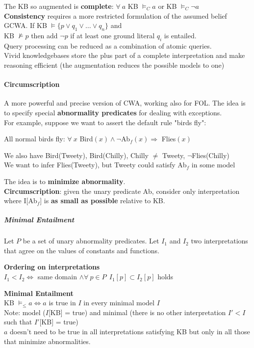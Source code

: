 \documentclass[10pt]{report}
\begin{document}
The KB so augmented is \textbf{complete}: $\forall\:a$ KB $\vDash_C a$ or KB $\vDash_C \neg a$\\
\textbf{Consistency} requires a more restricted formulation of the assumed belief GCWA. If KB $\vDash \{p\vee q_1\vee\ldots\vee q_n\}$ and\\KB $\not\vDash p$ then add $\neg p$ if at least one ground literal $q_i$ is entailed.\\
Query processing can be reduced as a combination of atomic queries.\\
Vivid knowledgebases store the plus part of a complete interpretation and make reasoning efficient (the augmentation reduces the possible models to one)
\paragraph{Circumscription} A more powerful and precise version of CWA, working also for FOL. The idea is to specify special \textbf{abnormality predicates} for dealing with exceptions.\\
For example, suppose we want to assert the default rule "birds fly":
\begin{list}{}{}
	\item All normal birds fly: $\forall\:x$ Bird$(x) \wedge\neg$Ab$_f(x)\Rightarrow$ Flies$(x)$
	\item We also have Bird(Tweety), Bird(Chilly), Chilly $\neq$ Tweety, $\neg$Flies(Chilly)\\
	We want to infer Flies(Tweety), but Tweety could satisfy Ab$_f$ in some model
\end{list}
The idea is to \textbf{minimize abnormality}.\\
\textbf{Circumscription}: given the unary predicate Ab, consider only interpretation where I[Ab$_f$] is \textbf{as small as possible} relative to KB.
\subparagraph{Minimal Entailment} Let $P$ be a set of unary abnormality predicates. Let $I_1$ and $I_2$ two interpretations that agree on the values of constants and functions.\begin{list}{}{}
	\item \textbf{Ordering on interpretations}\\
	$I_1 < I_2 \Leftrightarrow$ same domain $\wedge\forall\:p\in P\:\:I_1[p]\subset I_2[p]$ holds
	\item \textbf{Minimal Entailment}\\
	KB $\vDash_\leq a \Leftrightarrow a$ is true in $I$ in every minimal model $I$\\
	Note: model ($I$[KB] = true) and minimal (there is no other interpretation $I' < I$ such that $I'$[KB] = true)\\
	$a$ doesn't need to be true in all interpretations satisfying KB but only in all those that minimize abnormalities.
\end{list}
\end{document}
